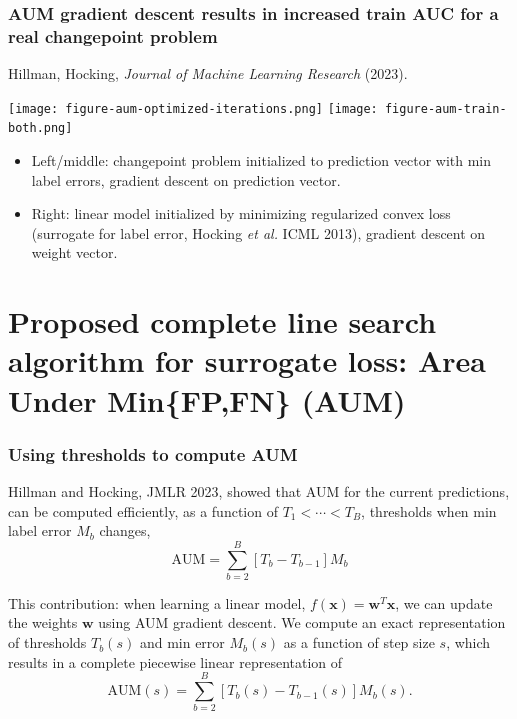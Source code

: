 \documentclass[t]{beamer}
\begin{document}
\begin{frame}
  \frametitle{AUM gradient descent results in increased train AUC for
    a real changepoint problem}
 
Hillman, Hocking, \emph{Journal of Machine Learning Research} (2023).

\texttt{[image: figure-aum-optimized-iterations.png]}
\texttt{[image: figure-aum-train-both.png]}

\begin{itemize}
\item Left/middle: changepoint problem initialized to prediction vector with
  min label errors, gradient descent on prediction vector.
\item Right: linear model initialized by minimizing regularized convex
  loss (surrogate for label error, Hocking \emph{et al.} ICML 2013),
  gradient descent on weight vector.
\end{itemize}

\end{frame}

\section{Proposed complete line search algorithm for surrogate loss: Area Under Min\{FP,FN\} (AUM)} 

\begin{frame}
  \frametitle{Using thresholds to compute AUM}
Hillman and Hocking, JMLR 2023, showed that AUM for the
current predictions, can be computed efficiently, as a function of
$T_1<\cdots<T_B$, thresholds when min label error $M_b$ changes,
\begin{equation*}
  \text{AUM} = \sum_{b=2}^B [T_{b} - T_{b-1}] M_b
\end{equation*}

This contribution: when learning a linear model,
$f(\mathbf x)= \mathbf w^T \mathbf x$, we can update the weights
$\mathbf w$ using AUM gradient descent. We compute an exact
representation of thresholds $T_b(s)$ and min error $M_b(s)$ as a
function of step size $s$, which results in a complete piecewise
linear representation of
\begin{equation*}
  \text{AUM}(s) = \sum_{b=2}^B [T_{b}(s) - T_{b-1}(s)] M_b(s).
\end{equation*}
 
\end{frame}
\end{document}
